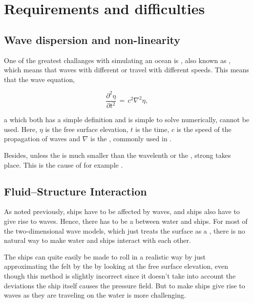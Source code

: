 \chapter{Requirements and difficulties}

\section{Wave dispersion and non-linearity}

One of the greatest challanges with simulating an ocean is , also known as , which means that waves with different \wavelengths or \frequencies travel with different speeds. This means that the wave equation,

\begin{equation} \label{eq:wave_equation}
\frac{\partial^2 \eta}{\partial t^2} \,=\, c^2\nabla^2\eta,
\end{equation}

a \PDE which both has a simple definition and is simple to solve numerically, cannot be used. Here, $\eta$ is the free surface elevation, $t$ is the time, $c$ is the speed of the propagation of waves and $\nabla$ is the , commonly used in .

Besides, unless the  is much smaller than the wavelenth or the , strong  takes place. This is the cause of for example .

\section{Fluid--Structure Interaction}

As noted previously, ships have to be affected by waves, and ships also have to give rise to waves. Hence, there has to be a  between water and ships. For most of the two-dimensional wave models, which just treats the surface as a , there is no natural way to make water and ships interact with each other.

The ships can quite easily be made to roll in a realistic way by just approximating the  felt by the  by looking at the free surface elevation, even though this method is slightly incorrect since it doesn't take into account the deviations the ship itself causes the pressure field. But to make ships give rise to waves as they are traveling on the water is more challenging.

